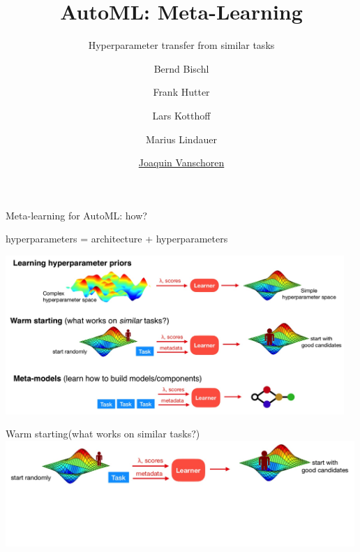 
\usepackage{multimedia}

\title[Meta-Learning]{AutoML: Meta-Learning} 
\subtitle{Hyperparameter transfer from similar tasks}
\author[Joaquin Vanschoren]{Bernd Bischl \and Frank Hutter \and Lars Kotthoff\newline \and Marius Lindauer \and \underline{Joaquin Vanschoren}}
\institute{}
\date{}


\maketitle


\begin{frame}{Meta-learning for AutoML: how?}
\small\centerline{hyperparameters = architecture + hyperparameters}


\centering\includegraphics[height=6cm]{image/img195525.jpg}

\end{frame}

\begin{frame}{Warm starting}{(what works on similar tasks?)}
    \centering\includegraphics[height=4cm]{image/img203410.jpg}
\end{frame}

